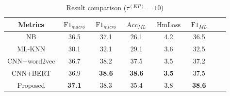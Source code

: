 \begin{table}
    \centering
    \caption{Result comparison (\(\tau^{(KP)}=10 \))}\label{tbl:bsline4}
    \begin{tabular}{cccccccc}
        \toprule
        Metrics      & \(\operatorname{F1}_{macro}\) & \(\operatorname{F1}_{micro}\) & \(\operatorname{Acc}_{ML}\) & \(\operatorname{HmLoss}\) & \(\operatorname{F1}_{ML}\) \\
        \midrule
        NB           & 36.5                          & 37.1                          & 26.1                        & 4.2                       & 36.5                       \\
        ML-KNN       & 30.1                          & 32.1                          & 29.1                        & 3.6                       & 32.5                       \\
        CNN+word2vec & 36.7                          & 38.2                          & 37.5                        & 3.5                       & 37.2                       \\
        CNN+BERT     & 36.9                          & \textbf{38.6}                 & \textbf{38.6}               & \textbf{3.5}              & 37.5                       \\
        Proposed     & \textbf{37.1}                 & 38.3                          & 35.4                        & 3.8                       & \textbf{38.6}              \\
        \bottomrule
    \end{tabular}
\end{table}


